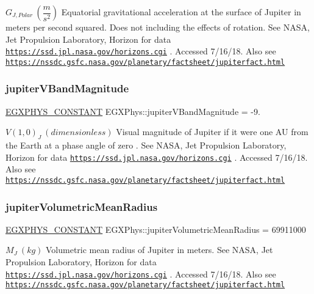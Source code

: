 $ G_{J,Polar} \ (\dfrac{m}{s^2})$ Equatorial gravitational acceleration at the surface of Jupiter in meters per second squared. Does not including the effects of rotation. See N\+A\+SA, Jet Propulsion Laboratory, Horizon for data \href{https://ssd.jpl.nasa.gov/horizons.cgi}{\tt https\+://ssd.\+jpl.\+nasa.\+gov/horizons.\+cgi} . Accessed 7/16/18. Also see \href{https://nssdc.gsfc.nasa.gov/planetary/factsheet/jupiterfact.html}{\tt https\+://nssdc.\+gsfc.\+nasa.\+gov/planetary/factsheet/jupiterfact.\+html} \mbox{\label{group___e_g_x_phys-_constants-_astrophysics-_solar_system-_jupiter-_bulk_ga58ab15a15b0a0512da0f1adae198ec69}} 
\subsubsection{\texorpdfstring{jupiter\+V\+Band\+Magnitude}{jupiterVBandMagnitude}}
{\footnotesize\ttfamily \mbox{\hyperlink{group___e_g_x_phys-_constants-_macros_ga76980d288494ce1714c9ac68a95ba702}{E\+G\+X\+P\+H\+Y\+S\+\_\+\+C\+O\+N\+S\+T\+A\+NT}} E\+G\+X\+Phys\+::jupiter\+V\+Band\+Magnitude = -\/9.}

$ V(1,0)_{J} \ (dimensionless)$ Visual magnitude of Jupiter if it were one AU from the Earth at a phase angle of zero . See N\+A\+SA, Jet Propulsion Laboratory, Horizon for data \href{https://ssd.jpl.nasa.gov/horizons.cgi}{\tt https\+://ssd.\+jpl.\+nasa.\+gov/horizons.\+cgi} . Accessed 7/16/18. Also see \href{https://nssdc.gsfc.nasa.gov/planetary/factsheet/jupiterfact.html}{\tt https\+://nssdc.\+gsfc.\+nasa.\+gov/planetary/factsheet/jupiterfact.\+html} \mbox{\label{group___e_g_x_phys-_constants-_astrophysics-_solar_system-_jupiter-_bulk_gab96ee9108c321647b7ae0c490e797b6f}} 
\subsubsection{\texorpdfstring{jupiter\+Volumetric\+Mean\+Radius}{jupiterVolumetricMeanRadius}}
{\footnotesize\ttfamily \mbox{\hyperlink{group___e_g_x_phys-_constants-_macros_ga76980d288494ce1714c9ac68a95ba702}{E\+G\+X\+P\+H\+Y\+S\+\_\+\+C\+O\+N\+S\+T\+A\+NT}} E\+G\+X\+Phys\+::jupiter\+Volumetric\+Mean\+Radius = 69911000}

$M_{J} \ (kg)$ Volumetric mean radius of Jupiter in meters. See N\+A\+SA, Jet Propulsion Laboratory, Horizon for data \href{https://ssd.jpl.nasa.gov/horizons.cgi}{\tt https\+://ssd.\+jpl.\+nasa.\+gov/horizons.\+cgi} . Accessed 7/16/18. Also see \href{https://nssdc.gsfc.nasa.gov/planetary/factsheet/jupiterfact.html}{\tt https\+://nssdc.\+gsfc.\+nasa.\+gov/planetary/factsheet/jupiterfact.\+html} 